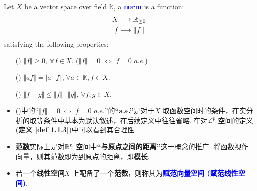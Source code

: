 	\begin{defn}\label{def 1.1.1}
		Let $X$ be a vector space over field $\mathbb{K}$, a \underline{\textcolor{blue}{\textbf{norm}}} is a function:
		\begin{align}
			X &\longrightarrow \mathbb{R}_{\geq 0} \\
			f &\longmapsto \Vert f \Vert
		\end{align}
		satisfying the following properties:
		\begin{enumerate}
			\item[(\rmnum{1})]$\Vert f \Vert \geq 0$, $\forall f \in X$. \hspace*{3em} ($\Vert f \Vert = 0 \,\, \Leftrightarrow \,\, f = 0 \,\, a.e.$)
			
			\item[(\rmnum{2})]$\Vert af \Vert = \left| a \right| \Vert f \Vert$, $\forall a \in \mathbb{K}, f \in X$.
			
			\item[(\rmnum{3})]$\Vert f + g \Vert \leq \Vert f \Vert + \Vert g \Vert$, $\forall f , g \in X$.
		\end{enumerate}
		
		\vspace{2em}
		\begin{rmk}
			\begin{itemize}
				\item ()中的“$\Vert f \Vert = 0 \,\, \Leftrightarrow \,\, f = 0 \,\, a.e.$”的\textbf{“a.e.”}是对于$X$ 取函数空间时的条件，在实分析的取等条件中基本为默认叙述，在后续定义中往往省略. 在对$\mathcal{L}^p$ 空间的定义 (\textbf{定义 \ref{def 1.1.3}})中可以看到其合理性.
				
				\vspace{1em}
				
				\item \textbf{范数}实际上是对$\mathbb{R}^n$ 空间中\textbf{“与原点之间的距离”}这一概念的推广. 将函数视作向量，则其范数即为到原点的距离，即\textbf{模长}.
				
				\vspace{1em}
				
				\item 若一个\textbf{线性空间}$X$ 上配备了一个\textbf{范数}，则称其为\textcolor{blue}{\textbf{赋范向量空间 (赋范线性空间)}}.
			\end{itemize}
		\end{rmk}
	\end{defn}
	
